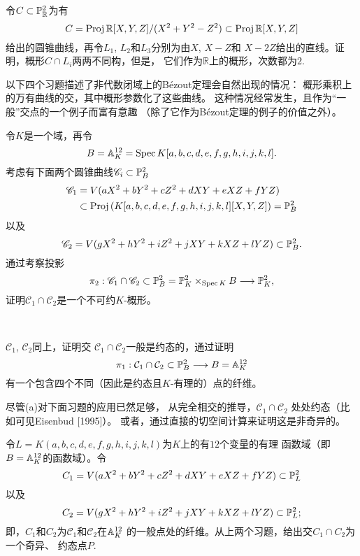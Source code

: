 \begin{exe}\label{exe:3.72}
令$C\subset \P_{\mathbb R}^2$为有
\[
	C=\proj \mathbb R[X,Y,Z]/(X^2+Y^2-Z^2)
	\subset \proj \mathbb R[X,Y,Z]
\]
给出的圆锥曲线，再令$L_1$, $L_2$和$L_3$分别为由$X$, $X-Z$和
$X-2Z$给出的直线。证明，概形$C\cap L_i$两两不同构，但是，
它们作为$\mathbb R$上的概形，次数都为$2$.
\end{exe}


以下四个习题描述了非代数闭域上的B\'ezout定理会自然出现的情况：
概形乘积上的万有曲线的交，其中概形参数化了这些曲线。
这种情况经常发生，且作为“一般”交点的一个例子而富有意趣
（除了它作为B\'ezout定理的例子的价值之外）。

\begin{exe}\label{exe:3.73}
令$K$是一个域，再令
\[
	B=\A_K^{12}=\spec K[a,b,c,d,e,f,g,h,i,j,k,l].
\]
考虑有下面两个圆锥曲线$\mathscr C_i\subset \P_B^2$
\begin{align*}
	\mathscr C_1&=V(aX^2+bY^2+cZ^2+dXY+eXZ+fYZ)\\
	&\subset \proj\left(
	K[a,b,c,d,e,f,g,h,i,j,k,l][X,Y,Z]
	\right)=\P_B^2
\end{align*}
以及
\[
	\mathscr C_2=
	V(gX^2+hY^2+iZ^2+jXY+kXZ+lYZ)\subset \P_B^2.
\]
通过考察投影
\[
	\pi_2:\mathscr C_1\cap \mathscr C_2
	\subset \P_B^2=\P_K^2\times_{\spec K}B
	\longrightarrow \P_K^2,
\]
证明$\mathscr C_1\cap \mathscr C_2$是一个不可约$K$-概形。
\end{exe}

\begin{exe}~\label{exe:3.74}
\begin{compactenum}[(a)]
	\item $\mathscr C_1$, $\mathscr C_2$同上，证明交
	$\mathscr C_1\cap \mathscr C_2$一般是约态的，通过证明
	\[
		\pi_1:\mathcal C_1\cap \mathcal C_2\subset \P_B^2
		\longrightarrow B=\A_K^{12}
	\]
	有一个包含四个不同（因此是约态且$K$-有理的）点的纤维。
	\item 尽管(a)对下面习题的应用已然足够，
	从完全相交的\nottran 推导，$\mathscr C_1\cap \mathscr C_2$
	处处约态（比如可见Eisenbud [1995]）。
	或者，通过直接的切空间计算来证明这是非奇异的。
\end{compactenum}
\end{exe}

\begin{exe}\label{exe:3.75}
令$L=K(a,b,c,d,e,f,g,h,i,j,k,l)$为$K$上的有$12$个变量的有理
函数域（即$B=\A_K^{12}$的函数域）。令
\[
	C_1=V(aX^2+bY^2+cZ^2+dXY+eXZ+fYZ)\subset \P_L^2
\]
以及
\[
	C_2=V(gX^2+hY^2+iZ^2+jXY+kXZ+lYZ)\subset \P_L^2;
\]
即，$C_1$和$C_2$为$\mathscr C_1$和$\mathscr C_2$在$\A_K^{12}$
的一般点处的纤维。从上两个习题，给出交$C_1\cap C_2$为一个奇异、
约态点$P$.
\end{exe}

